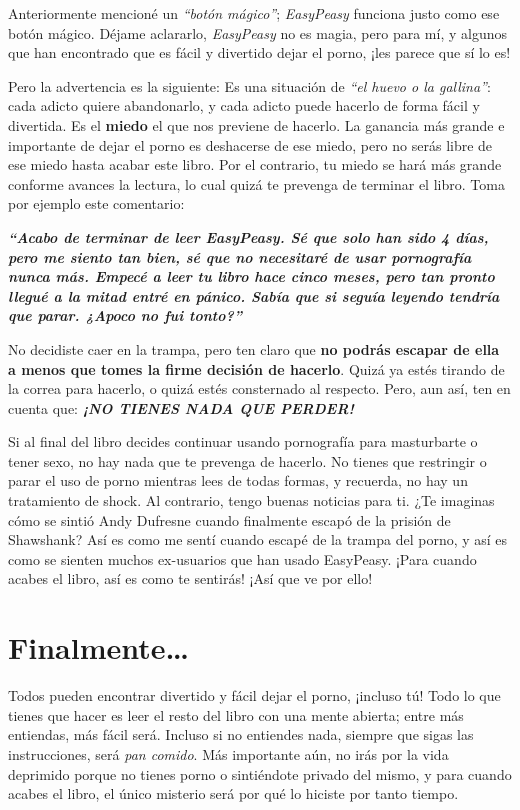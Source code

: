 \documentclass[
  spanish,
  openany]{book}
\begin{document}
Anteriormente mencioné un \emph{``botón mágico''}; \emph{EasyPeasy} funciona justo como ese botón mágico. Déjame aclararlo, \emph{EasyPeasy} no es magia, pero para mí, y algunos que han encontrado que es fácil y divertido dejar el porno, ¡les parece que sí lo es!

Pero la advertencia es la siguiente: Es una situación de \emph{``el huevo o la gallina''}: cada adicto quiere abandonarlo, y cada adicto puede hacerlo de forma fácil y divertida. Es el \textbf{miedo} el que nos previene de hacerlo. La ganancia más grande e importante de dejar el porno es deshacerse de ese miedo, pero no serás libre de ese miedo hasta acabar este libro. Por el contrario, tu miedo se hará más grande conforme avances la lectura, lo cual quizá te prevenga de terminar el libro. Toma por ejemplo este comentario:

\emph{\textbf{``Acabo de terminar de leer EasyPeasy. Sé que solo han sido 4 días, pero me siento tan bien, sé que no necesitaré de usar pornografía nunca más. Empecé a leer tu libro hace cinco meses, pero tan pronto llegué a la mitad entré en pánico. Sabía que si seguía leyendo tendría que parar. ¿Apoco no fui tonto?''}}

No decidiste caer en la trampa, pero ten claro que \textbf{no podrás escapar de ella a menos que tomes la firme decisión de hacerlo}. Quizá ya estés tirando de la correa para hacerlo, o quizá estés consternado al respecto. Pero, aun así, ten en cuenta que: \emph{\textbf{¡NO TIENES NADA QUE PERDER!}}

Si al final del libro decides continuar usando pornografía para masturbarte o tener sexo, no hay nada que te prevenga de hacerlo. No tienes que restringir o parar el uso de porno mientras lees de todas formas, y recuerda, no hay un tratamiento de shock. Al contrario, tengo buenas noticias para ti. ¿Te imaginas cómo se sintió Andy Dufresne cuando finalmente escapó de la prisión de Shawshank? Así es como me sentí cuando escapé de la trampa del porno, y así es como se sienten muchos ex-usuarios que han usado EasyPeasy. ¡Para cuando acabes el libro, así es como te sentirás! ¡Así que ve por ello!

\hypertarget{finalmente}{%
\section*{Finalmente\ldots{}}\label{finalmente}}

Todos pueden encontrar divertido y fácil dejar el porno, ¡incluso tú! Todo lo que tienes que hacer es leer el resto del libro con una mente abierta; entre más entiendas, más fácil será. Incluso si no entiendes nada, siempre que sigas las instrucciones, será \emph{pan comido}. Más importante aún, no irás por la vida deprimido porque no tienes porno o sintiéndote privado del mismo, y para cuando acabes el libro, el único misterio será por qué lo hiciste por tanto tiempo.
\end{document}
